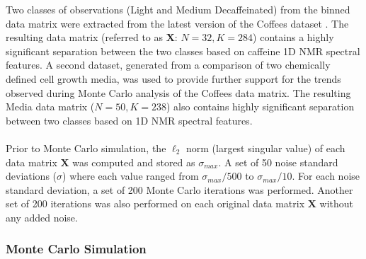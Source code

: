 \begin{doublespace}
Two classes of observations (Light and Medium Decaffeinated) from the binned
data matrix were extracted from the latest version of the Coffees
dataset \cite{worley:acscb2014}. The resulting data matrix (referred to as
$\mathbf{X}$: $N = 32, K = 284$) contains a highly significant separation
between the two classes based on caffeine 1D \hnmr{} NMR spectral features.
A second dataset, generated from a comparison of two chemically defined cell
growth media, was used to provide further support for the trends observed
during Monte Carlo analysis of the Coffees data matrix. The resulting Media
data matrix ($N = 50, K = 238$) also contains highly significant separation
between two classes based on 1D \hnmr{} NMR spectral features.
\\\\
Prior to Monte Carlo simulation, the $\ell_2$ norm (largest singular value) of
each data matrix $\mathbf{X}$ was computed and stored as $\sigma_{max}$. A set
of 50 noise standard deviations ($\sigma$) where each value ranged from
$\sigma_{max}/500$ to $\sigma_{max}/10$. For each noise standard deviation,
a set of 200 Monte Carlo iterations was performed. Another set of 200
iterations was also performed on each original data matrix $\mathbf{X}$ without
any added noise.
\end{doublespace}

\subsubsection{Monte Carlo Simulation}

